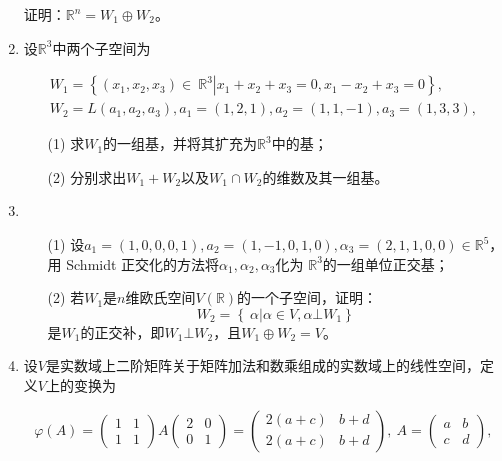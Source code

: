 \begin{enumerate}
          证明：\(\mathbb{R}^{n} = W_1 \oplus W_2\)。

    \item 设\(\mathbb{R}^3\)中两个子空间为

          \begin{align*}
              W_1 = \left\{ \left( x_1,x_2,x_3 \right) \in \left. \ \mathbb{R}^3 \right|x_1 + x_2 + x_3 = 0,x_1 - x_2 + x_3 = 0 \right\}, \\
              W_2 = L\left( a_1,a_2,a_3 \right),a_1 = (1,2,1),a_2 = (1,1, - 1),a_3 = (1,3,3),
          \end{align*}

          \begin{enumerate}
              \item[(1)] 求\(W_1\)的一组基，并将其扩充为\(\mathbb{R}^3\)中的基；
              \item[(2)] 分别求出\(W_1 + W_2\)以及\(W_1 \cap W_2\)的维数及其一组基。
          \end{enumerate}

    \item
          \begin{enumerate}
              \item[(1)] 设\(a_1 = (1,0,0,0,1),a_2 = (1, - 1,0,1,0),\alpha_3 = (2,1,1,0,0) \in \mathbb{R}^{5}\)，用
                    Schmidt 正交化的方法将\(\alpha_1,\alpha_2,\alpha_3\)化为
                    \(\mathbb{R}^3\)的一组单位正交基；
              \item[(2)] 若\(W_1\)是\(n\)维欧氏空间\(V\left( \mathbb{R} \right)\)的一个子空间，证明：
                    \[W_2 = \left\{ \left. \ \alpha \right|\alpha \in V,\alpha\bot W_1 \right\}\]
                    是\(W_1\)的正交补，即\(W_1\bot W_2\)，且\(W_1 \oplus W_2 = V\)。
          \end{enumerate}

    \item 设\(V\)是实数域上二阶矩阵关于矩阵加法和数乘组成的实数域上的线性空间，定义\(V\)上的变换为

          \[\varphi(A) =
              \begin{pmatrix}
                  1 & 1 \\
                  1 & 1
              \end{pmatrix} A \begin{pmatrix}
                  2 & 0 \\
                  0 & 1
              \end{pmatrix} = \begin{pmatrix}
                  2(a + c) & b + d \\
                  2(a + c) & b + d
              \end{pmatrix},\ A = \begin{pmatrix}
                  a & b \\
                  c & d
              \end{pmatrix},\]


\end{enumerate}
